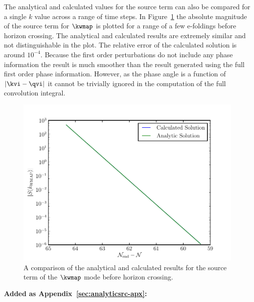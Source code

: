 The analytical and calculated values for the source term can also be compared for a single $k$
value across a range of time steps. In Figure~\ref{fig:analytic-prehorizon-corr} the absolute
magnitude of the source term for $\kwmap$ is plotted for a range of a few e-foldings before horizon
crossing. The analytical and calculated results are extremely similar and not distinguishable in the
plot. The relative error of the calculated solution is around $10^{-4}$. Because the first order
perturbations do not include any phase information the result is much smoother than the result
generated using the full first order phase information. However, as the phase angle is a function of
$|\kvi-\qvi|$ it cannot be trivially ignored in the computation of the full convolution integral. 

\begin{figure}
 \centering
 \includegraphics{numerical/graphs/analytic_v_calced_prehorizon-large.pdf}
 \caption[Comparison of Solutions Before Horizon Crossing]{A comparison of the analytical and
calculated results for the source term of the $\kwmap$ mode before horizon crossing.}
 \label{fig:analytic-prehorizon-corr}
\end{figure}

\textbf{Added as Appendix~\ref{sec:analyticsrc-apx}:}

